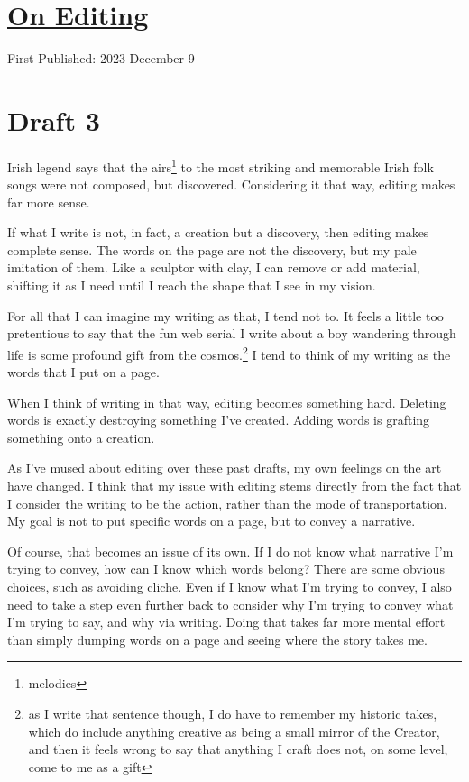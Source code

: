 \documentclass[12pt]{article}[titlepage]
\newcommand{\1}{\={a}}
\newcommand{\2}{\={e}}
\newcommand{\3}{\={\i}}
\newcommand{\4}{\=o}
\newcommand{\5}{\=u}
\newcommand{\6}{\={A}}
\renewcommand{\,}{\textsuperscript{,}}
\begin{document}
\doublespacing
\section{\href{editing.html}{On Editing}}
First Published: 2023 December 9

\section{Draft 3}
Irish legend says that the airs\footnote{melodies} to the most striking and memorable Irish folk songs were not composed, but discovered.
Considering it that way, editing makes far more sense.

If what I write is not, in fact, a creation but a discovery, then editing makes complete sense.
The words on the page are not the discovery, but my pale imitation of them.
Like a sculptor with clay, I can remove or add material, shifting it as I need until I reach the shape that I see in my vision.

For all that I can imagine my writing as that, I tend not to.
It feels a little too pretentious to say that the fun web serial I write about a boy wandering through life is some profound gift from the cosmos.\footnote{as I write that sentence though, I do have to remember my historic takes, which do include anything creative as being a small mirror of the Creator, and then it feels wrong to say that anything I craft does not, on some level, come to me as a gift}
I tend to think of my writing as the words that I put on a page.

When I think of writing in that way, editing becomes something hard.
Deleting words is exactly destroying something I've created.
Adding words is grafting something onto a creation.

As I've mused about editing over these past drafts, my own feelings on the art have changed.
I think that my issue with editing stems directly from the fact that I consider the writing to be the action, rather than the mode of transportation.
My goal is not to put specific words on a page, but to convey a narrative.

Of course, that becomes an issue of its own.
If I do not know what narrative I'm trying to convey, how can I know which words belong?
There are some obvious choices, such as avoiding cliche.
Even if I know what I'm trying to convey, I also need to take a step even further back to consider why I'm trying to convey what I'm trying to say, and why via writing.
Doing that takes far more mental effort than simply dumping words on a page and seeing where the story takes me.
\end{document}
